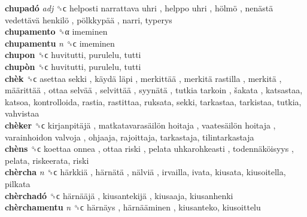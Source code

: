 \textbf{chupadó} \emph{adj}  ␝ϲ   helposti narrattava uhri ,  helppo uhri ,  hölmö ,  nenästä vedettävä henkilö ,  pölkkypää , narri, typerys  \\
\textbf{chupamento} ␝α  imeminen  \\
\textbf{chupamentu} \emph{n}  ␝ϲ  imeminen  \\
\textbf{chupon} ␝ϲ  huvitutti, purulelu, tutti  \\
\textbf{chupòn} ␝ϲ  huvitutti, purulelu, tutti  \\
\textbf{chèk} ␝ϲ   asettaa sekki ,  käydä läpi ,  merkittää ,  merkitä rastilla ,  merkitä ,  määrittää ,  ottaa selvää ,  selvittää ,  syynätä ,  tutkia tarkoin ,  šakata , katsastaa, katsoa, kontrolloida, rastia, rastittaa, ruksata, sekki, tarkastaa, tarkistaa, tutkia, vahvistaa  \\
\textbf{chèker} ␝ϲ   kirjanpitäjä ,  matkatavarasäilön hoitaja ,  vaatesäilön hoitaja ,  varainhoidon valvoja , ohjaaja, rajoittaja, tarkastaja, tilintarkastaja  \\
\textbf{chèns} ␝ϲ   koettaa onnea ,  ottaa riski ,  pelata uhkarohkeasti ,  todennäköisyys , pelata, riskeerata, riski  \\
\textbf{chèrcha} \emph{n}  ␝ϲ   härkkiä ,  härnätä ,  nälviä , irvailla, ivata, kiusata, kiusoitella, pilkata  \\
\textbf{chèrchadó} ␝ϲ   härnääjä ,  kiusantekijä , kiusaaja, kiusanhenki  \\
\textbf{chèrchamentu} \emph{n}  ␝ϲ   härnäys ,  härnääminen , kiusanteko, kiusoittelu  \\

